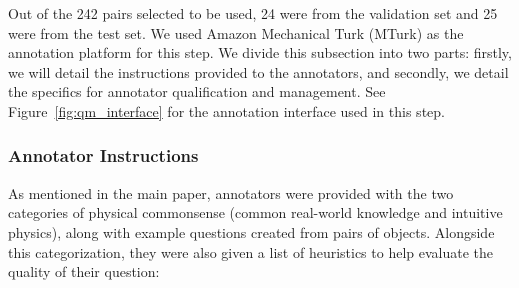 \documentclass[runningheads]{llncs}
\begin{document}
Out of the 242 pairs selected to be used, 24 were from the validation set and 25 were from the test set. We used Amazon Mechanical Turk (MTurk) as the annotation platform for this step. We divide this subsection into two parts: firstly, we will detail the instructions provided to the annotators, and secondly, we detail the specifics for annotator qualification and management. See Figure~\ref{fig:qm_interface} for the annotation interface used in this step. 

\subsubsection{Annotator Instructions} As mentioned in the main paper, annotators were provided with the two categories of physical commonsense (common real-world knowledge and intuitive physics), along with example questions created from pairs of objects. Alongside this categorization, they were also given a list of heuristics to help evaluate the quality of their question:
\end{document}
